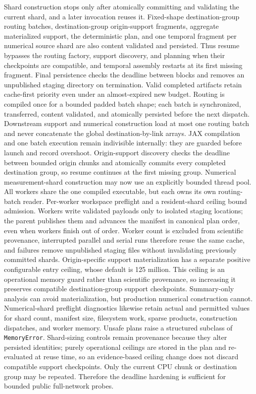Shard construction stops only after atomically committing and validating the
current shard, and a later invocation reuses it.  Fixed-shape destination-group
routing batches,
destination-group origin-support fragments, aggregate materialized support, the
deterministic plan, and one temporal fragment per numerical source shard are
also content validated and persisted.
Thus resume bypasses the routing factory, support discovery, and planning when
their checkpoints are compatible, and temporal assembly restarts at its first
missing fragment.  Final persistence checks the deadline between blocks and
removes an unpublished staging directory on termination.  Valid
completed artifacts retain cache-first priority even under an almost-expired
new budget. Routing is compiled once for a bounded padded batch shape; each
batch is synchronized, transferred, content validated, and atomically persisted
before the next dispatch. Downstream support and numerical construction load at
most one routing batch and never concatenate the global destination-by-link
arrays. JAX compilation and one batch execution remain indivisible internally:
they are guarded before launch and record overshoot. Origin-support discovery checks
the deadline between bounded origin chunks and atomically commits every
completed destination group, so resume continues at the first missing group.
Numerical measurement-shard construction may now use an explicitly bounded
thread pool.  All workers share the one compiled executable, but each owns its
own routing-batch reader.  Per-worker workspace preflight and a resident-shard
ceiling bound admission.  Workers write validated payloads only to isolated
staging locations; the parent publishes them and advances the manifest in
canonical plan order, even when workers finish out of order.  Worker count is
excluded from scientific provenance, interrupted parallel and serial runs
therefore reuse the same cache, and failures remove unpublished staging files
without invalidating previously committed shards.
Origin-specific support materialization has a separate positive configurable
entry ceiling, whose default is 125 million.  This ceiling is an operational
memory guard rather than scientific provenance, so increasing it preserves
compatible destination-group support checkpoints.  Summary-only analysis can
avoid materialization, but production numerical construction cannot.
Numerical-shard preflight diagnostics likewise retain actual and permitted
values for shard count, manifest size, filesystem work, sparse products,
construction dispatches, and worker memory.  Unsafe plans raise a structured
subclass of \texttt{MemoryError}.  Shard-sizing controls remain provenance
because they alter persisted identities; purely operational ceilings are stored
in the plan and re-evaluated at reuse time, so an evidence-based ceiling change
does not discard compatible support checkpoints.
Only the current CPU chunk or destination group may be repeated. Therefore the
deadline hardening is sufficient for bounded public full-network probes.

